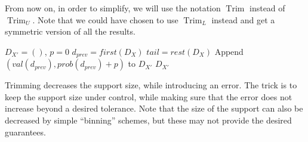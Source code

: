 \documentclass[review]{elsarticle}
\newtheorem{lemma}{Lemma}
\DeclareMathOperator{\support}{support}
\DeclareMathOperator{\Trim}{Trim}
\begin{document}
From now on, in order to simplify, we will use the notation $\Trim$ instead of $\Trim_U$. Note that we could have chosen to use $\Trim_L$ instead and get a symmetric version of all the results.



\begin{algorithm}
  \DontPrintSemicolon
  { 
             $D_{X'}=()$, $p=0$ \;	  
  		$d_{prev} = first(D_X)$\;
                $tail = rest(D_X)$ \;
       		 Append $(val(d_{prev}), prob(d_{prev})+p)$ to  $D_{X'}$\;
  \Return $D_{X'}$}
     
\caption{$\Trim$($D_X$,$\varepsilon$)  }
\label{alg:Trim}
\end{algorithm}

Trimming decreases the support size, while introducing an error. The trick is
to keep the support size under control, while making sure that the error does
not increase beyond a desired tolerance.
Note that the size of the support can also be decreased by simple ``binning'' 
schemes, but these may not provide the desired guarantees.

%
\end{document}
